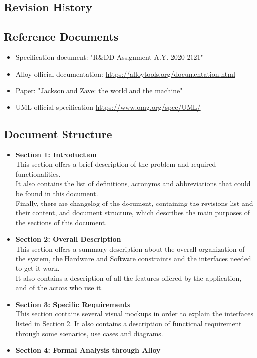 \documentclass[table, 12pt]{article}
\begin{document}
\begin{flushleft}
    \subsection{Revision History}
    \subsection{Reference Documents}
    \begin{itemize}
        \item {Specification document: "R\&DD Assignment A.Y. 2020-2021"}
        \item {Alloy official documentation: \href{https://alloytools.org/documentation.html}{https://alloytools.org/documentation.html}}
        \item {Paper: "Jackson and Zave: the world and the machine"}
        \item {UML official specification \href{https://www.omg.org/spec/UML/}{https://www.omg.org/spec/UML/}}
    \end{itemize}
    \subsection{Document Structure}
    \begin{itemize}
        \item {\textbf{Section 1: Introduction}\\This section offers a brief description of the problem and required functionalities. \\It also contains the list of definitions, acronyms and abbreviations that could be found in this document. \\Finally, there are changelog of the document, containing the revisions list and their content, and document structure, which describes the main purposes of the sections of this document.}
        \item {\textbf{Section 2: Overall Description}\\This section offers a summary description about the overall organization of the system, the Hardware and Software constraints and the interfaces needed to get it work.\\It also contains a description of all the features offered by the application, and of the actors who use it.}
        \item {\textbf{Section 3: Specific Requirements}\\This section contains several visual mockups in order to explain the interfaces listed in Section 2. It also contains a description of functional requirement through some scenarios, use cases and diagrams.}
        \item {\textbf{Section 4: Formal Analysis through Alloy}}
    \end{itemize}
    \newpage

\end{flushleft}
\end{document}
